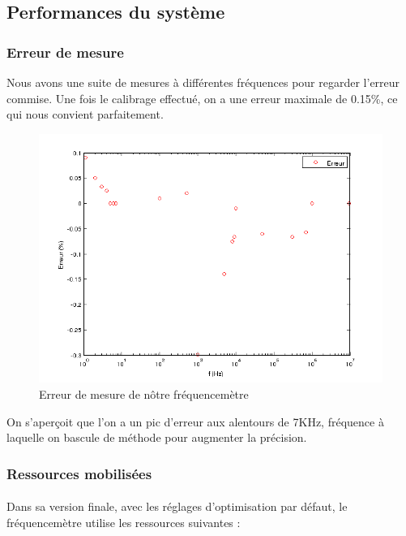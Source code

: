 \documentclass[a4paper,11pt]{article}
\begin{document}
  

\subsection{Performances du système}

\subsubsection{Erreur de mesure}
Nous avons une suite de mesures à différentes fréquences pour regarder l'erreur commise. Une fois le calibrage effectué, on a une erreur maximale
de 0.15\%, ce qui nous convient parfaitement.  
\begin{figure}[H]
\begin{center}
	\includegraphics[scale=.7]{mesure_erreur.png}
	\caption{Erreur de mesure de nôtre fréquencemètre}
\end{center}
\end{figure}
On s'aperçoit que l'on a un pic d'erreur aux alentours de 7KHz, fréquence à laquelle on bascule de méthode pour augmenter la précision.

\subsubsection{Ressources mobilisées}

\paragraph{} Dans sa version finale, avec les réglages d'optimisation par défaut, le fréquencemètre utilise les ressources suivantes :
\end{document}
